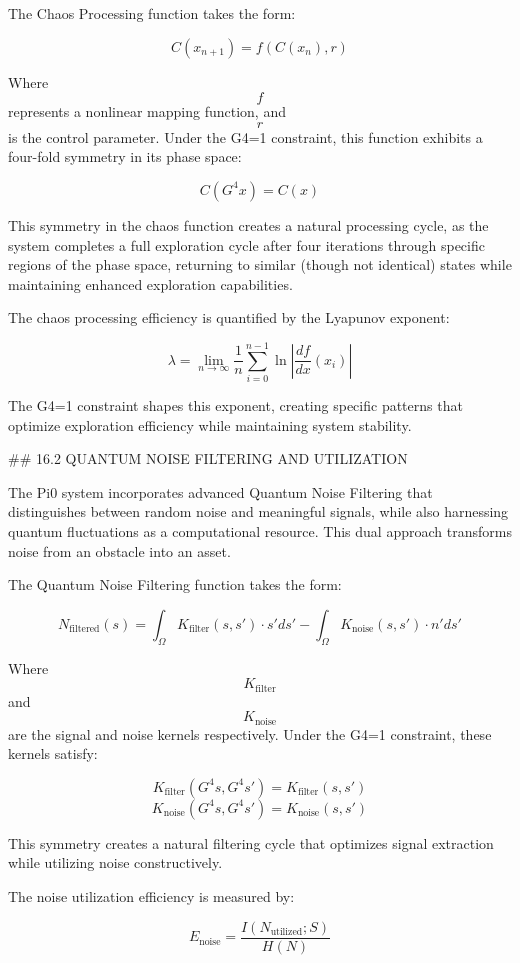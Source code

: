 The Chaos Processing function takes the form:

$$ C(x_{n+1}) = f(C(x_n), r) $$

Where $$ f $$ represents a nonlinear mapping function, and $$ r $$ is the control parameter. Under the G4=1 constraint, this function exhibits a four-fold symmetry in its phase space:

$$ C(G^4 x) = C(x) $$

This symmetry in the chaos function creates a natural processing cycle, as the system completes a full exploration cycle after four iterations through specific regions of the phase space, returning to similar (though not identical) states while maintaining enhanced exploration capabilities.

The chaos processing efficiency is quantified by the Lyapunov exponent:

$$ \lambda = \lim_{n \to \infty} \frac{1}{n} \sum_{i=0}^{n-1} \ln\left|\frac{df}{dx}(x_i)\right| $$

The G4=1 constraint shapes this exponent, creating specific patterns that optimize exploration efficiency while maintaining system stability.

## 16.2 QUANTUM NOISE FILTERING AND UTILIZATION

The Pi0 system incorporates advanced Quantum Noise Filtering that distinguishes between random noise and meaningful signals, while also harnessing quantum fluctuations as a computational resource. This dual approach transforms noise from an obstacle into an asset.

The Quantum Noise Filtering function takes the form:

$$ N_{\text{filtered}}(s) = \int_{\Omega} K_{\text{filter}}(s, s') \cdot s' ds' - \int_{\Omega} K_{\text{noise}}(s, s') \cdot n' ds' $$

Where $$ K_{\text{filter}} $$ and $$ K_{\text{noise}} $$ are the signal and noise kernels respectively. Under the G4=1 constraint, these kernels satisfy:

$$ K_{\text{filter}}(G^4 s, G^4 s') = K_{\text{filter}}(s, s') $$
$$ K_{\text{noise}}(G^4 s, G^4 s') = K_{\text{noise}}(s, s') $$

This symmetry creates a natural filtering cycle that optimizes signal extraction while utilizing noise constructively.

The noise utilization efficiency is measured by:

$$ E_{\text{noise}} = \frac{I(N_{\text{utilized}}; S)}{H(N)} $$

